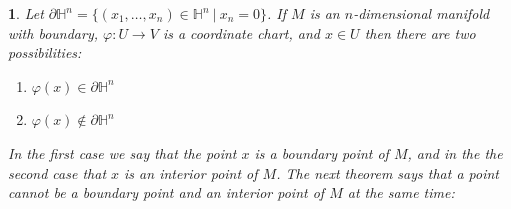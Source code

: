 \documentclass[11pt, letterpaper, oneside]{report}
\theoremstyle{pplain}
\newtheorem{ITERMVALUE THM}[theorem]{Intermediate Value Theorem}
\newtheorem{HEINEBOREL THM}[theorem]{Heine-Borel Theorem}
\newtheorem{UMETR THM}[theorem]{Urysohn Metrization Theorem}
\newtheorem{UMETR2 THM}[theorem]{Urysohn Metrization Theorem (v.2)}
\theoremstyle{ddefinition}
\theoremstyle{nnn}
\newtheorem{nn}[theorem]{}
\newtheorem{TDA NN}[theorem]{Topological Data Analysis. }
\theoremstyle{eexercise}
\newcommand{\HH}{{\mathbb H}}
\newcommand{\benu}{\begin{enumerate}}
\newcommand{\eenu}{\end{enumerate}}
\begin{document}
\begin{nn}
Let $\partial \HH^{n} = \{ (x_{1}, \dots, x_{n})\in \HH^{n} \ | \ x_{n} = 0\}$.  If $M$ is an $n$-dimensional 
manifold with boundary,  $\varphi\colon U\to V$ is a coordinate chart, and $x\in U$ then 
there are two possibilities: 
\benu
\item $\varphi(x) \in \partial \HH^{n}$  
\item $\varphi(x) \not\in \partial \HH^{n}$
\eenu


In the first case we say that the point $x$ is a \emph{boundary point} of $M$, and in the
the second case that $x$ is an \emph{interior point} of $M$. 
The next theorem says that a point cannot be a boundary point and an interior point of $M$ at the same time:
\end{nn}
\end{document}
